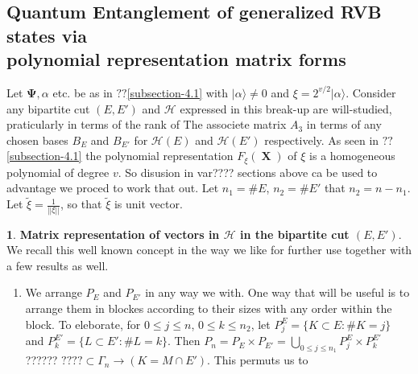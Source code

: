 \documentclass[a4paper,12pt]{article}
\DeclareMathOperator{\x}{\mathrm{X}}
\theoremstyle{definition}
\theoremstyle{underlinethm}
\theoremstyle{definition}
\newtheorem{subsubsec}{}[subsection]
\begin{document}
\subsection{Quantum Entanglement of generalized RVB states via\\ polynomial representation matrix forms}\label{subsection-4.2}

Let $\boldsymbol{\Psi}, \alpha$ etc. be as in $??$\ref{subsection-4.1} with $| \alpha \rangle \neq 0$ and $\xi = 2^{v/2} | \alpha \rangle$. Consider any bipartite cut $(E, E')$ and $\mathcal{H}$ expressed in this break-up are will-studied, praticularly in terms of the rank of The associete  matrix $A_{3}$ in terms of any chosen bases $B_{E}$ and $B_{E'}$ for $\mathcal{H}(E)$ and $\mathcal{H}(E')$ respectively. As seen in $??$\ref{subsection-4.1} the polynomial representation $F_{\xi}(\boldsymbol{\x})$ of $\xi$ is a homogeneous polynomial of degree $v$. So disusion in var???? sections above ca be used to advantage we proced to work that out. Let $n_{1}=\# E$, $n_{2} = \#E'$ that $n_{2}= n-n_{1}$. Let $\tilde{\xi} = \frac{1}{|| \xi ||}$, so that $\tilde{\xi}$ is unit vector.

\begin{subsubsec}
\textbf{Matrix representation of vectors in $\mathcal{H}$ in the bipartite cut $(E, E')$}. We recall this well known concept in the way we like for further use together with a few results as well.
\begin{enumerate}[label = (\alph*)]
\item We arrange $P_{E}$ and $P_{E'}$ in any way we with. One way that will be useful is to arrange them in blockes according to their sizes with any order within the block. To eleborate, for $0 \leq j \leq n$, $0 \leq k \leq n_{2}$, let $P_{j}^{E} = \{K \subset E : \# K =j\}$ and $P_{k}^{E'} = \{L \subset E' : \# L =k\}$. Then $P_{n}= P_{E} \times P_{E'}= \bigcup\limits_{0 \leq j \leq n_{1}} P_{j}^{E} \times P_{k}^{E'}$ ?????? $???? \subset \Gamma_{n} \rightarrow (K=M \cap E')$. This permuts us to

\end{enumerate}
\end{subsubsec}
\end{document}
